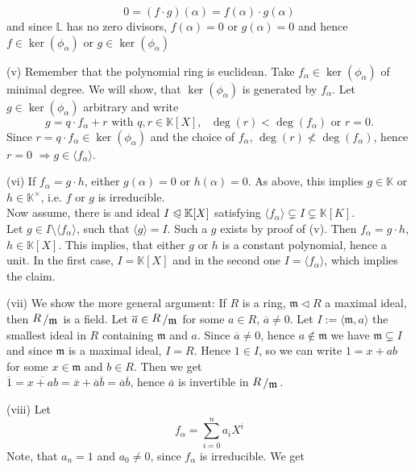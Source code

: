 \documentclass[12pt]{book}
\newcommand{\slant}[2]{{\raisebox{.1em}{$#1$}\left/\raisebox{-.1em}{$#2$}\right.}}
\begin{document}
\begin{spacing}{1.3}
\begin{compactenum}
$$0=(f\cdot g)(\alpha)=f(\alpha) \cdot g(\alpha)$$
and since $\mathbb{L}$ has no zero divisors, $f(\alpha)=0$ or $g(\alpha)=0$ and hence $f \in \ker(\phi_{\alpha})$ or $g \in \ker(\phi_{\alpha})$
\item[(v)] Remember that the polynomial ring is euclidean. Take $f_{\alpha} \in \ker(\phi_{\alpha})$ of minimal degree. We will show, that $\ker(\phi_{\alpha})$ is generated by $f_{\alpha}$. Let $g \in \ker(\phi_{\alpha})$ arbitrary and write $$g=q \cdot f_{\alpha} + r\textrm{ with }q,r \in \mathbb{K}[X], \textrm{ }\deg(r)<\deg(f_{\alpha})\textrm{ or }r=0.$$Since $r=q\cdot f_{\alpha} \in \ker(\phi_{\alpha})$ and the choice of $f_{\alpha}$, $\deg(r) \nless \deg(f_{\alpha})$, hence $r=0$ $\Rightarrow g \in \langle f_{\alpha} \rangle$.
\item[(vi)] If $f_{\alpha}=g \cdot h$, either $g(\alpha)=0$ or $h(\alpha)=0$. As above, this implies $g \in \mathbb{K}$ or $h \in \mathbb{K}^{\times}$, i.e. $f$ or $g$ is irreducible.\\
Now assume, there is and ideal $I \trianglelefteqslant \mathbb{K}[X]$ satisfying $\langle f_{\alpha}\rangle \subsetneq I \subsetneq \mathbb{K}[K]$.\\
Let $g \in  I \setminus \langle f_{\alpha}\rangle$, such that $\langle g \rangle = I $. Such a $g$ exists by proof of (v). Then $f_{\alpha}=g \cdot h$, $h \in \mathbb{K}[X]$. This implies, that either $g$ or $h$ is a constant polynomial, hence a unit. In the first case, $I=\mathbb{K}[X]$ and in the second one $I=\langle f_{\alpha}\rangle$, which implies the claim.
\item[(vii)] We show the more general argument: If $R$ is a ring, $\mathfrak{m} \triangleleft R$ a maximal ideal, then $\slant{R}{\mathfrak{m}}$ is a field. Let $\overline{a} \in \slant{R}{\mathfrak{m}}$ for some $a \in R$, $\overline{a}\neq 0$. Let $I:=\langle \mathfrak{m}, a\rangle$ the smallest ideal in $R$ containing $\mathfrak{m}$ and $a$. Since $\overline{a} \neq 0$, hence $a \notin \mathfrak{m}$ we have $\mathfrak{m} \subsetneq I$ and since $\mathfrak{m}$ is a maximal ideal, $I=R$. Hence $1 \in I$, so we can write $1=x+ab$ for some $x \in \mathfrak{m}$ and $b \in R$. Then we get\\
$\overline{1}=\overline{x+ab}=\overline{x}+\overline{a}\overline{b}=\overline{a}\overline{b}$, hence $\overline{a}$ is invertible in $\slant{R}{\mathfrak{m}}$.
\item[(viii)] Let $$f_{\alpha}=\sum_{i=0}^n a_i X^{i}$$
Note, that $a_n=1$ and $a_0 \neq 0$, since $f_{\alpha}$ is irreducible. We get\\[-27pt]

\end{compactenum}
\end{spacing}
\end{document}
